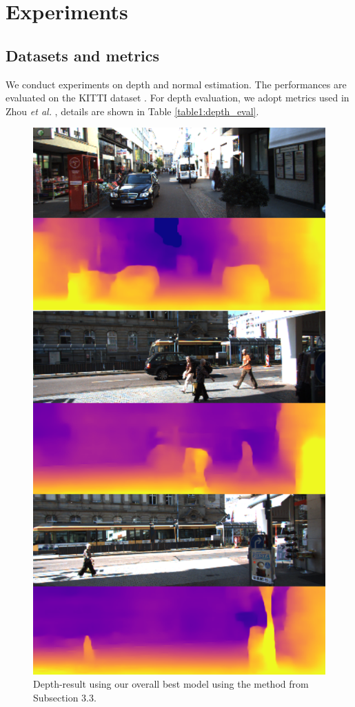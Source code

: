 \documentclass[10pt,twocolumn,letterpaper]{article}
\begin{document}
\section{Experiments}

\subsection{Datasets and metrics}
We conduct experiments on depth and normal estimation. The performances are evaluated on the KITTI dataset \cite{kitti}. For depth evaluation, we adopt metrics used in Zhou \textit{et al.} \cite{zhou2017unsupervised}, details are shown in Table \ref{table1:depth_eval}.

\begin{figure}[t]
  \includegraphics[width=\columnwidth]{dresult.png}
  \caption{Depth-result using our overall best model using the method from Subsection 3.3.}
  \label{fig:depth_result}
\end{figure}
\end{document}
